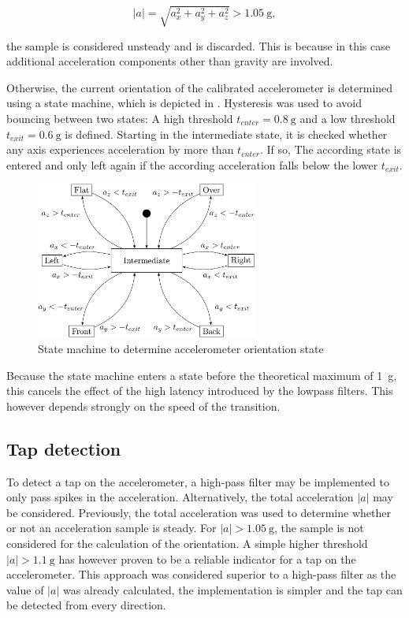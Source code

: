 \documentclass[a4paper, 12pt]{article}
\begin{document}
\begin{equation}
	|a| = \sqrt{a_x^2 + a_y^2 + a_z^2} > \SI{1.05}{\gram},
\end{equation}

the sample is considered unsteady and is discarded. This is because in this case additional acceleration components other than gravity are involved.

Otherwise, the current orientation of the calibrated accelerometer is determined using a state machine, which is depicted in . Hysteresis was used to avoid bouncing between two states: A high threshold $t_{enter} = \SI{0.8}{\gram}$ and a low threshold $t_{exit} = \SI{0.6}{\gram}$ is defined. Starting in the intermediate state, it is checked whether any axis experiences acceleration by more than $t_{enter}$. If so, The according state is entered and only left again if the according acceleration falls below the lower $t_{exit}$.

\begin{figure}[h!]
	\centering
	\includegraphics[width=0.65\textwidth]{stm.png}
	\caption{State machine to determine accelerometer orientation state}
	\label{fig:stm}
\end{figure}

Because the state machine enters a state before the theoretical maximum of \SI{1}{\gram}, this cancels the effect of the high latency introduced by the lowpass filters. This however depends strongly on the speed of the transition.

\subsection{Tap detection}
To detect a tap on the accelerometer, a high-pass filter may be implemented to only pass spikes in the acceleration. Alternatively, the total acceleration $|a|$ may be considered. Previously, the total acceleration was used to determine whether or not an acceleration sample is steady. For $|a| > \SI{1.05}{\gram}$, the sample is not considered for the calculation of the orientation. A simple higher threshold $|a| > \SI{1.1}{\gram}$ has however proven to be a reliable indicator for a tap on the accelerometer. This approach was considered superior to a high-pass filter as the value of $|a|$ was already calculated, the implementation is simpler and the tap can be detected from every direction.

\sloppy
\printbibliography
\end{document}
